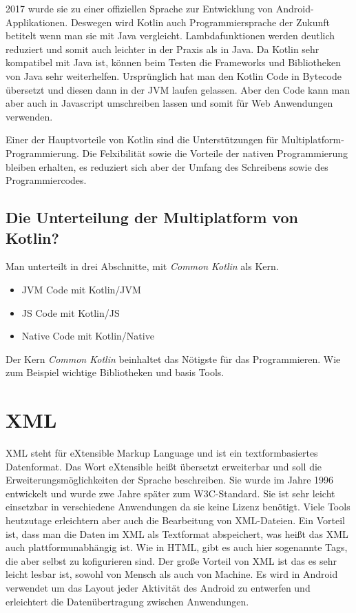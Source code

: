2017 wurde sie zu einer offiziellen Sprache zur Entwicklung von Android-Applikationen. Deswegen wird Kotlin auch Programmiersprache der Zukunft betitelt wenn man sie mit Java vergleicht.
Lambdafunktionen werden deutlich reduziert und somit auch leichter in der Praxis als in Java. 
Da Kotlin sehr kompatibel mit Java ist, können beim Testen die Frameworks und Bibliotheken von Java sehr weiterhelfen.  
Ursprünglich hat man den Kotlin Code in Bytecode übersetzt und diesen dann in der JVM laufen gelassen. 
Aber den Code kann man aber auch in Javascript umschreiben lassen und somit für Web Anwendungen verwenden.

Einer der Hauptvorteile von Kotlin sind die Unterstützungen für Multiplatform-Programmierung.
Die Felxibilität sowie die Vorteile der nativen Programmierung bleiben erhalten, es reduziert sich aber 
der Umfang des Schreibens sowie des Programmiercodes.


\subsection{Die Unterteilung der Multiplatform von Kotlin?}

Man unterteilt in drei Abschnitte, mit \textit{Common Kotlin} als Kern.

\begin{itemize}
    \item JVM Code mit Kotlin/JVM
    \item JS Code mit Kotlin/JS
    \item Native Code mit Kotlin/Native
\end{itemize}

Der Kern \textit{Common Kotlin} beinhaltet das  Nötigste für das Programmieren. Wie zum Beispiel wichtige Bibliotheken
und basis Tools.




\section{XML}
\cite{XML1}
\cite{XML2}
\author{Bozidar Spasenovic}
XML steht für eXtensible Markup Language und ist ein textformbasiertes Datenformat.
Das Wort eXtensible heißt übersetzt erweiterbar und soll die Erweiterungsmöglichkeiten der Sprache beschreiben.
Sie wurde im Jahre 1996 entwickelt und wurde zwe Jahre später zum W3C-Standard. 
Sie ist sehr leicht einsetzbar in verschiedene Anwendungen da sie keine Lizenz benötigt.
Viele Tools heutzutage erleichtern aber auch die Bearbeitung von XML-Dateien.
Ein Vorteil ist, dass man die Daten im XML als Textformat abspeichert, was heißt das XML auch plattformunabhängig ist.
Wie in HTML, gibt es auch hier sogenannte Tags, die aber selbst zu kofigurieren sind. 
Der große Vorteil von XML ist das es sehr leicht lesbar ist, sowohl von Mensch als auch von Machine.
Es wird in Android verwendet um das Layout jeder Aktivität des Android zu entwerfen und erleichtert die Datenübertragung zwischen Anwendungen.




